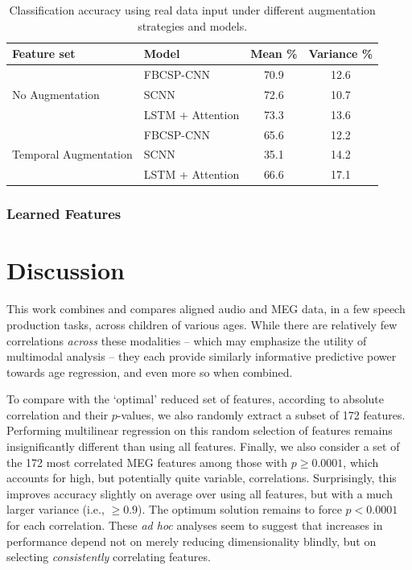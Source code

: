 \documentclass[utf8]{frontiersSCNS} %
\begin{document}
\begin{table}[t]
  \centering
  \label{tab:end2end_results}
  \begin{tabular}{l l | c | c}
    \toprule
    \textbf{Feature set} & \textbf{Model} & \textbf{Mean \%} & \textbf{Variance \%} \\
    \toprule
    \multirow{3}{*}{No Augmentation}
                         & FBCSP-CNN           & 70.9 & 12.6  \\
                         & SCNN                & 72.6 & 10.7  \\
                         & LSTM + Attention    & 73.3 & 13.6  \\ 
    \midrule
    \multirow{3}{*}{Temporal Augmentation}
                         & FBCSP-CNN           & 65.6 & 12.2  \\
                         & SCNN                & 35.1 & 14.2  \\
                         & LSTM + Attention    & 66.6 & 17.1  \\ 
    \bottomrule
  \end{tabular}
  \caption{Classification accuracy using real data input under different augmentation strategies and models.}
\end{table}

\subsubsection{Learned Features}

\section{Discussion}


This work combines and compares aligned audio and MEG data, in a few speech production tasks, across children of various ages. While there are relatively few correlations {\em across} these modalities -- which may emphasize the utility of multimodal analysis -- they each provide similarly informative predictive power towards age regression, and even more so when combined.

To compare with the `optimal' reduced set of features, according to absolute correlation and their $p$-values, we also randomly extract a subset of 172 features. Performing multilinear regression on this random selection of features remains insignificantly different than using all features. Finally, we also consider a set of the 172 most correlated MEG features among those with $p \geq 0.0001$, which accounts for high, but potentially quite variable, correlations. Surprisingly, this improves accuracy slightly on average over using all features, but with a much larger variance (i.e., $\geq 0.9$). The optimum solution remains to force $p<0.0001$ for each correlation. These {\em ad hoc} analyses seem to suggest that increases in performance depend not on merely reducing dimensionality blindly, but on selecting {\em consistently} correlating features. %
\end{document}
